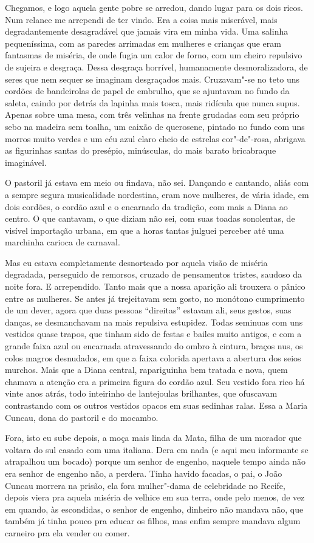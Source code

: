 \begin{linenumbers}
Chegamos, e logo aquela gente pobre se arredou, dando lugar para os dois
ricos. Num relance me arrependi de ter vindo. Era a coisa mais
miserável, mais degradantemente desagradável que jamais vira em minha
vida. Uma salinha pequeníssima, com as paredes arrimadas em mulheres e
crianças que eram fantasmas de miséria, de onde fugia um calor de forno,
com um cheiro repulsivo de sujeira e desgraça. Dessa desgraça horrível,
humanamente desmoralizadora, de seres que nem sequer se imaginam
desgraçados mais. Cruzavam"-se no teto uns cordões de bandeirolas de
papel de embrulho, que se ajuntavam no fundo da saleta, caindo por
detrás da lapinha mais tosca, mais ridícula que nunca supus. Apenas
sobre uma mesa, com três velinhas na frente grudadas com seu próprio
sebo na madeira sem toalha, um caixão de querosene, pintado no fundo com
uns morros muito verdes e um céu azul claro cheio de estrelas
cor"-de"-rosa, abrigava as figurinhas santas do presépio, minúsculas, do
mais barato bricabraque imaginável.

O pastoril já estava em meio ou findava, não sei. Dançando e cantando,
aliás com a sempre segura musicalidade nordestina, eram nove mulheres,
de vária idade, em dois cordões, o cordão azul e o encarnado da
tradição, com mais a Diana ao centro. O que cantavam, o que diziam não
sei, com suas toadas sonolentas, de visível importação urbana, em que a
horas tantas julguei perceber até uma marchinha carioca de carnaval.

Mas eu estava completamente desnorteado por aquela visão de miséria
degradada, perseguido de remorsos, cruzado de pensamentos tristes,
saudoso da noite fora. E arrependido. Tanto mais que a nossa aparição
ali trouxera o pânico entre as mulheres. Se antes já trejeitavam sem
gosto, no monótono cumprimento de um dever, agora que duas pessoas
``direitas'' estavam ali, seus gestos, suas danças, se desmanchavam na
mais repulsiva estupidez. Todas seminuas com uns vestidos quase trapos,
que tinham sido de festas e bailes muito antigos, e com a grande faixa
azul ou encarnada atravessando do ombro à cintura, braços nus, os colos
magros desnudados, em que a faixa colorida apertava a abertura dos seios
murchos. Mais que a Diana central, rapariguinha bem tratada e nova, quem
chamava a atenção era a primeira figura do cordão azul. Seu vestido fora
rico há vinte anos atrás, todo inteirinho de lantejoulas brilhantes, que
ofuscavam contrastando com os outros vestidos opacos em suas sedinhas
ralas. Essa a Maria Cuncau, dona do pastoril e do mocambo.

Fora, isto eu sube depois, a moça mais linda da Mata, filha de um
morador que voltara do sul casado com uma italiana. Dera em nada (e aqui
meu informante se atrapalhou um bocado) porque um senhor de engenho,
naquele tempo ainda não era senhor de engenho não, a perdera. Tinha
havido facadas, o pai, o João Cuncau morrera na prisão, ela fora
mulher"-dama de celebridade no Recife, depois viera pra aquela miséria de
velhice em sua terra, onde pelo menos, de vez em quando, às escondidas,
o senhor de engenho, dinheiro não mandava não, que também já tinha pouco
pra educar os filhos, mas enfim sempre mandava algum carneiro pra ela
vender ou comer.


\end{linenumbers}
